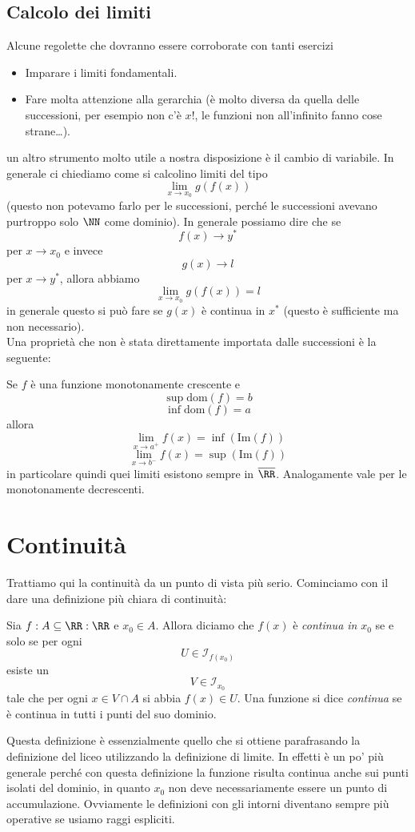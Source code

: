 \documentclass[11pt]{scrartcl}
\begin{document}
	\subsection{Calcolo dei limiti}
	Alcune regolette che dovranno essere corroborate con tanti esercizi
	\begin{itemize}
		\item Imparare i limiti fondamentali.
		\item Fare molta attenzione alla gerarchia (è molto diversa da quella delle successioni, per esempio non c'è $x!$, le funzioni non all'infinito fanno cose strane\dots).
	\end{itemize}
	un altro strumento molto utile a nostra disposizione è il cambio di variabile. In generale ci chiediamo come si calcolino limiti del tipo
	$$\lim_{x\to x_0}g(f(x))$$
	(questo non potevamo farlo per le successioni, perché le successioni avevano purtroppo solo $\NN$ come dominio). In generale possiamo dire che se 
	$$f(x)\to y^*$$
	per $x\to x_0$ e invece
	$$g(x)\to l$$
	per $x\to y^*$, allora abbiamo
	$$\lim_{x\to x_0}g(f(x))=l$$
	in generale questo si può fare se $g(x)$ è continua in $x^*$ (questo è sufficiente ma non necessario). \\
	Una proprietà che non è stata direttamente importata dalle successioni è la seguente:
	\begin{theorem}
		Se $f$ è una funzione monotonamente crescente e 
		$$\sup\text{dom}(f)=b$$
		$$\inf\text{dom}(f)=a$$
		allora 
		$$\lim_{x\to a^+}f(x)=\inf(\text{Im}(f))$$
		$$\lim_{x\to b^-}f(x)=\sup(\text{Im}(f))$$
		in particolare quindi quei limiti esistono sempre in $\overline{\RR}$. Analogamente vale per le monotonamente decrescenti.
	\end{theorem}
	
	\newpage
	
	\section{Continuità}
	
	Trattiamo qui la continuità da un punto di vista più serio.  Cominciamo con il dare una definizione più chiara di continuità:
	\begin{definition}
		Sia $f:A\subseteq\RR:\RR$ e $x_0\in A$. Allora diciamo che $f(x)$ è \textit{continua in} $x_0$ se e solo se per ogni 
		$$U\in \mathcal{I}_{f(x_0)}$$
		esiste un 
		$$V\in \mathcal{I}_{x_0}$$ 
		tale che per ogni $x\in V\cap A$ si abbia $f(x)\in U$. Una funzione si dice \textit{continua} se è continua in tutti i punti del suo dominio.
	\end{definition}
	Questa definizione è essenzialmente quello che si ottiene parafrasando la definizione del liceo utilizzando la definizione di limite. In effetti è un po' più generale perché con questa definizione la funzione risulta continua anche sui punti isolati del dominio, in quanto $x_0$ non deve necessariamente essere un punto di accumulazione. Ovviamente le definizioni con gli intorni diventano sempre più operative se usiamo raggi espliciti.
	
\end{document}
